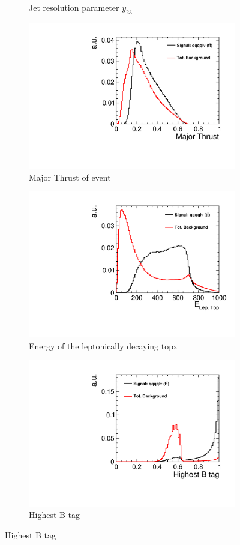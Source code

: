 \begin{figure}[]
\begin{subfigure}[b]{0.5\linewidth}
    \caption{Jet resolution parameter $y_{23}$} 
    \vspace{4ex}
  \end{subfigure}%
  \begin{subfigure}[b]{0.5\linewidth}
    \centering
    \includegraphics[width=0.75\linewidth]{TopAnalysis/figures/BDTVariables/majthval.pdf} 
    \caption{Major Thrust of event} 
    \vspace{4ex}
  \end{subfigure}
  \begin{subfigure}[b]{0.5\linewidth}
    \centering
    \includegraphics[width=0.75\linewidth]{TopAnalysis/figures/BDTVariables/LeptonicTopEnergy.pdf} 
    \caption{Energy of the leptonically decaying topx} 
    \vspace{4ex}
  \end{subfigure}%
    \begin{subfigure}[b]{0.5\linewidth}
    \centering
    \includegraphics[width=0.75\linewidth]{TopAnalysis/figures/BDTVariables/HighestBTag.pdf} 
    \caption{Highest B tag} 
    \vspace{4ex}
  \end{subfigure}
\end{figure}


